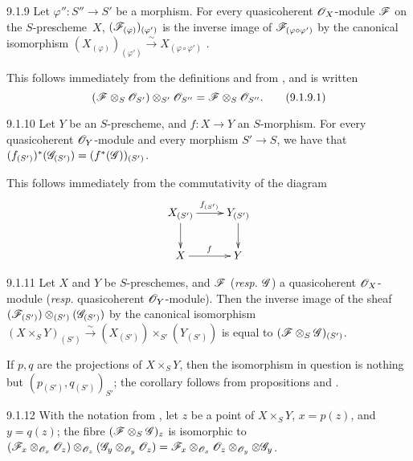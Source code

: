 \documentclass{book}
\begin{document}
\begin{envs}[Proposition]{9.1.9}
\label{prop-1.9.1.9}
Let $\varphi''\colon S''\to S'$ be a morphism.
For every quasicoherent $\mathscr{O}_X$-module $\mathscr{F}$ on the $S$-prescheme~$X$,
$(\mathscr{F}_{(\varphi)})_{(\varphi')}$ is the inverse image of
$\mathscr{F}_{(\varphi\circ\varphi')}$ by the canonical isomorphism
$(X_{(\varphi)})_{(\varphi')}\xrightarrow{\sim}X_{(\varphi\circ\varphi')}$
.
\end{envs}

This follows immediately from the definitions and from , and is
written
\[
  (\mathscr{F}\otimes_S\mathscr{O}_{S'})\otimes_{S'}\mathscr{O}_{S''}=\mathscr{F}\otimes_S\mathscr{O}_{S''}.\tag{9.1.9.1}
\]

\begin{envs}[Proposition]{9.1.10}
\label{prop-1.9.1.10}
Let $Y$ be an $S$-prescheme, and $f\colon X\to Y$ an $S$-morphism.
For every quasicoherent $\mathscr{O}_Y$-module and every morphism
$S'\to S$, we have that
$(f_{(S')})^\ast(\mathscr{G}_{(S')})=(f^\ast(\mathscr{G}))_{(S')}$.
\end{envs}

This follows immediately from the commutativity of the diagram 
\[
  \xymatrix{
    X_{(S')}\ar[r]^{f_{(S')}}\ar[d] & Y_{(S')}\ar[d]\\
    X\ar[r]^f & Y
  }
\]

\begin{envs}[Corollary]{9.1.11}
\label{cor-1.9.1.11}
Let $X$ and $Y$ be $S$-preschemes, and
$\mathscr{F}$ (\emph{resp.} $\mathscr{G}$) a quasicoherent $\mathscr{O}_X$-module
(\emph{resp.} quasicoherent $\mathscr{O}_Y$-module). Then the inverse image of the sheaf
$(\mathscr{F}_{(S')})\otimes_{(S')}(\mathscr{G}_{(S')})$ by the canonical isomorphism
$(X\times_S Y)_{(S')}\xrightarrow{\sim}(X_{(S')})\times_{S'}(Y_{(S')})$
 is equal to $(\mathscr{F}\otimes_S\mathscr{G})_{(S')}$.
\end{envs}

If $p,q$ are the projections of $X\times_S Y$, then the isomorphism in question
is nothing but $(p_{(S')}, q_{(S')})_{S'}$; the corollary follows from
propositions  and .

\begin{envs}[Proposition]{9.1.12}
\label{prop-1.9.1.12}
With the notation from , let $z$ be
a point of $X\times_S Y$, $x=p(z)$, and $y=q(z)$; the fibre
$(\mathscr{F}\otimes_S\mathscr{G})_z$ is isomorphic to
$(\mathscr{F}_x\otimes_{\mathscr{O}_x}\mathscr{O}_z)\otimes_{\mathscr{O}_z}(\mathscr{G}_y\otimes_{\mathscr{O}_y}\mathscr{O}_z)
=\mathscr{F}_x\otimes_{\mathscr{O}_x}\mathscr{O}_z\otimes_{\mathscr{O}_y}\otimes\mathscr{G}_y$.
\end{envs}
\end{document}
